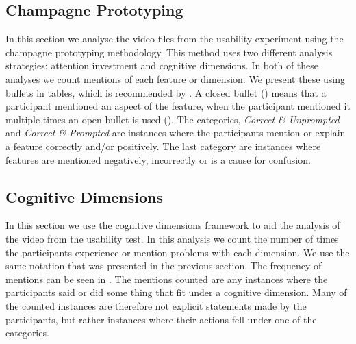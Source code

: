 \subsection{Champagne Prototyping}
In this section we analyse the video files from the usability experiment using the champagne prototyping methodology. This method uses two different analysis strategies; attention investment and cognitive dimensions. In both of these analyses we count mentions of each feature or dimension. We present these using bullets in tables, which is recommended by \cite{blackwell2004champagne}. A closed bullet (\mn) means that a participant mentioned an aspect of the feature, when the participant mentioned it multiple times an open bullet is used (\mns). The categories, \textit{Correct \& Unprompted} and \textit{Correct \& Prompted} are instances where the participants mention or explain a feature correctly and/or positively. The last category are instances where features are mentioned negatively, incorrectly or is a cause for confusion.



\subsection{Cognitive Dimensions}
In this section we use the cognitive dimensions framework to aid the analysis of the video from the usability test. In this analysis we count the number of times the participants experience or mention problems with each dimension. We use the same notation that was presented in the previous section. The frequency of mentions can be seen in . The mentions counted are any instances where the participants said or did some thing that fit under a cognitive dimension. Many of the counted instances are therefore not explicit statements made by the participants, but rather instances where their actions fell under one of the categories.

\begin{table}[H]
	\caption{Cognitive Dimensions Findings}
	\label{tab:cog-dim-findings}
\end{table}


